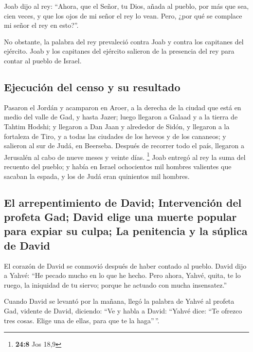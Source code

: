  Joab dijo al rey: ``Ahora, que el Señor, tu Dios, añada
al pueblo, por más que sea, cien veces, y que los ojos de mi señor el
rey lo vean. Pero, ¿por qué se complace mi señor el rey en esto?''.

 No obstante, la palabra del rey prevaleció contra Joab y
contra los capitanes del ejército. Joab y los capitanes del ejército
salieron de la presencia del rey para contar al pueblo de Israel.

\hypertarget{ejecuciuxf3n-del-censo-y-su-resultado}{%
\subsection{Ejecución del censo y su
resultado}\label{ejecuciuxf3n-del-censo-y-su-resultado}}

 Pasaron el Jordán y acamparon en Aroer, a la derecha de
la ciudad que está en medio del valle de Gad, y hasta Jazer;
 luego llegaron a Galaad y a la tierra de Tahtim Hodshi; y
llegaron a Dan Jaan y alrededor de Sidón,  y llegaron a la
fortaleza de Tiro, y a todas las ciudades de los heveos y de los
cananeos; y salieron al sur de Judá, en Beerseba.  Después
de recorrer todo el país, llegaron a Jerusalén al cabo de nueve meses y
veinte días. \footnote{\textbf{24:8} Jos 18,9}  Joab
entregó al rey la suma del recuento del pueblo; y había en Israel
ochocientos mil hombres valientes que sacaban la espada, y los de Judá
eran quinientos mil hombres.

\hypertarget{el-arrepentimiento-de-david-intervenciuxf3n-del-profeta-gad-david-elige-una-muerte-popular-para-expiar-su-culpa-la-penitencia-y-la-suxfaplica-de-david}{%
\subsection{El arrepentimiento de David; Intervención del profeta Gad;
David elige una muerte popular para expiar su culpa; La penitencia y la
súplica de
David}\label{el-arrepentimiento-de-david-intervenciuxf3n-del-profeta-gad-david-elige-una-muerte-popular-para-expiar-su-culpa-la-penitencia-y-la-suxfaplica-de-david}}

 El corazón de David se conmovió después de haber contado
al pueblo. David dijo a Yahvé: ``He pecado mucho en lo que he hecho.
Pero ahora, Yahvé, quita, te lo ruego, la iniquidad de tu siervo; porque
he actuado con mucha insensatez.''

 Cuando David se levantó por la mañana, llegó la palabra
de Yahvé al profeta Gad, vidente de David, diciendo: 
``Ve y habla a David: ``Yahvé dice: ``Te ofrezco tres cosas. Elige una
de ellas, para que te la haga''\,''.

